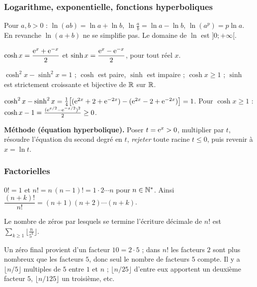 \subsubsection*{Logarithme, exponentielle, fonctions hyperboliques}
\begin{propriete}[Logarithme]
Pour $a,b>0$ : $\ln(ab)=\ln a+\ln b$, $\ln\frac ab=\ln a-\ln b$, $\ln(a^p)=p\ln a$. En revanche $\ln(a+b)$ ne se simplifie pas. Le domaine de $\ln$ est $]0;+\infty[$.
\end{propriete}
\begin{definition}
$\cosh x=\dfrac{\mathrm{e}^x+\mathrm{e}^{-x}}2$ et $\sinh x=\dfrac{\mathrm{e}^x-\mathrm{e}^{-x}}2$, pour tout réel $x$.
\end{definition}
\begin{propriete}
$\cosh^2x-\sinh^2x=1$ ; $\cosh$ est paire, $\sinh$ est impaire ; $\cosh x\ge1$ ; $\sinh$ est strictement croissante et bijective de $\mathbb{R}$ sur $\mathbb{R}$.
\end{propriete}
\begin{demonstration}
$\cosh^2x-\sinh^2x=\frac14\big[(\mathrm{e}^{2x}+2+\mathrm{e}^{-2x})-(\mathrm{e}^{2x}-2+\mathrm{e}^{-2x})\big]=1$. Pour $\cosh x\ge1$ : $\cosh x-1=\frac{(\mathrm{e}^{x/2}-\mathrm{e}^{-x/2})^2}2\ge0$.
\end{demonstration}
\begin{methode}
\textbf{Méthode (équation hyperbolique).} Poser $t=\mathrm{e}^x>0$, multiplier par $t$, résoudre l'équation du second degré en $t$, \emph{rejeter} toute racine $t\le0$, puis revenir à $x=\ln t$.
\end{methode}

\subsubsection*{Factorielles}
\begin{definition}
$0!=1$ et $n!=n\,(n-1)!=1\cdot2\cdots n$ pour $n\in\mathbb{N}^*$. Ainsi $\dfrac{(n+k)!}{n!}=(n+1)(n+2)\cdots(n+k)$.
\end{definition}
\begin{propriete}
Le nombre de zéros par lesquels se termine l'écriture décimale de $n!$ est $\displaystyle\sum_{k\ge1}\Big\lfloor\frac n{5^k}\Big\rfloor$.
\end{propriete}
\begin{demonstration}
Un zéro final provient d'un facteur $10=2\cdot5$ ; dans $n!$ les facteurs $2$ sont plus nombreux que les facteurs $5$, donc seul le nombre de facteurs $5$ compte. Il y a $\lfloor n/5\rfloor$ multiples de $5$ entre $1$ et $n$ ; $\lfloor n/25\rfloor$ d'entre eux apportent un deuxième facteur $5$, $\lfloor n/125\rfloor$ un troisième, etc.
\end{demonstration}

